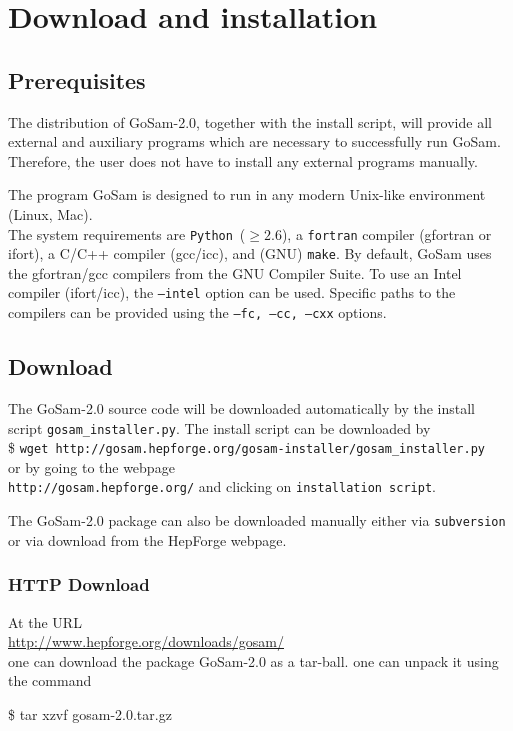\documentclass[11pt,a4paper]{refrep}
\newcommand{\gosamversion}{{2{.}0}}
\newcommand{\gosam}{{\sc GoSam}\xspace}
\newcommand{\packagename}{{gosam-\gosamversion}}
\newcommand{\python}{{\tt Python}\xspace}
\begin{document}
\chapter{Download and installation}
\section{Prerequisites}

The distribution of \gosam-\gosamversion{}, together with the install script, 
will provide all external and auxiliary programs which are necessary 
to successfully run \gosam. 
Therefore, the user does not have to install any external programs manually.

The program \gosam is designed to run in any modern Unix-like environment (Linux, Mac).\\
The system requirements are
\python~($\geq2.6$), 
a {\tt fortran} compiler (gfortran or ifort), 
a C/C++ compiler (gcc/icc), and (GNU) {\tt make}.
By default, \gosam uses the gfortran/gcc  compilers from the GNU Compiler Suite.
To use an Intel compiler  (ifort/icc), the {\tt --intel} option can be used.
Specific paths to the compilers can be provided using the {\tt --fc, --cc, --cxx}  options.


\section{Download}

The \gosam-\gosamversion{} source code 
will be downloaded automatically by the install script {\tt gosam\_installer.py}. 
The install script can be downloaded by \\
{\$  \tt wget http://gosam.hepforge.org/gosam-installer/gosam\_installer.py}\\
or by going to the webpage \\
{\tt http://gosam.hepforge.org/}
and clicking on {\tt installation script}.



The \gosam-\gosamversion{} package can also be downloaded 
manually either via \texttt{subversion}
or via  download from the {\sc HepForge} webpage.

\subsection*{HTTP Download}
At the URL \\
\url{http://www.hepforge.org/downloads/gosam/}\\
one can download the package
\gosam-\gosamversion{}  as a tar-ball. 
one can unpack it using the command
\begin{example}
\$ tar xzvf \packagename{}.tar.gz
\end{example}
\end{document}
